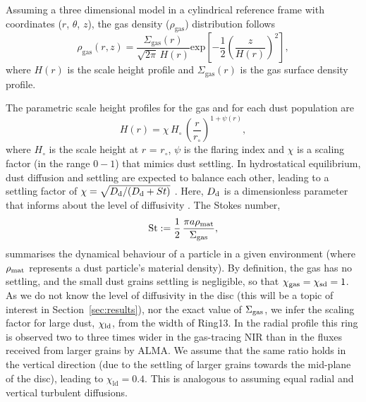 \documentclass[fleqn,usenatbib,useAMS]{mnras}
\begin{document}
Assuming a three dimensional model in a cylindrical reference frame with coordinates ($r$, $\theta$, $z$), the gas density ($\rho_{\mathrm{gas}}$) distribution follows
\begin{equation}
  \rho_{\mathrm{gas}}(r,z) =\frac{\Sigma_{\mathrm{gas}}(r)}{\sqrt{2\pi} \, H(r)} \mathrm{exp}\left[-\frac{1}{2} \left(\frac{z}{H(r)}\right)^2\right],
\end{equation}
where $H(r)$ is the scale height profile and $\Sigma_{\mathrm{gas}}(r)$ is the gas surface density profile.

The parametric scale height profiles for the gas and for each dust population are 
\begin{equation}
    \label{scale}
  H(r)=\chi \, H_{\circ} \,\left( \frac{r}{r_{\circ}}\right)^{1+\psi(r)},
\end{equation}
where $H_\circ$ is the scale height at $r$ = $r_\circ$, $\psi$ is the flaring index and $\chi$ is a scaling factor (in the range $0-1$) that mimics dust settling. In hydrostatical equilibrium, dust diffusion and settling are expected to balance each other, leading to a settling factor of $\chi = \sqrt{D_{\rm d}/(D_{\rm d} + St)}$ \citep{Dubrulle1995}. Here, $D_{\rm d}$ is a dimensionless parameter that informs about the level of diffusivity \citep[it is typically assumed to be similar to the level of turbulence for the particle sizes regarded here][]{2007Icar..192..588Y}. The Stokes number,
\begin{equation}
    {\rm St} := \frac{1}{2} \,\frac{\pi a \rho_{\rm mat}}{\Sigma_{\rm gas}}, 
\end{equation}
summarises the dynamical behaviour of a particle in a given environment (where $\rho_{\rm mat}$ represents a dust particle's material density). By definition, the gas has no settling, and the small dust grains settling is negligible, so that $\chi_{\rm gas}=\chi_{\rm sd}=1$. As we do not know the level of diffusivity in the disc (this will be a topic of interest in Section~\ref{sec:results}), nor the exact value of $\Sigma_{\rm gas}$, we infer the scaling factor for large dust, $\chi_{\rm ld}$, from the width of Ring13. In the radial profile this ring is observed two to three times wider in the gas-tracing NIR than in the fluxes received from larger grains by ALMA. We assume that the same ratio holds in the vertical direction (due to the settling of larger grains towards the mid-plane of the disc), leading to $\chi_{\mathrm{ld}}=0.4$. This is analogous to assuming equal radial and vertical turbulent diffusions.
\end{document}
